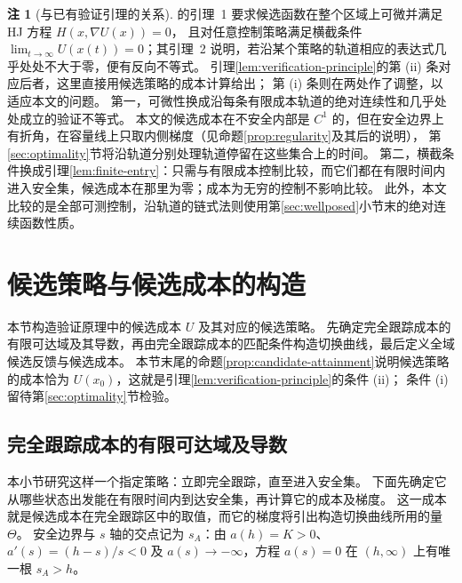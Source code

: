 \documentclass[11pt,a4paper,UTF8]{ctexart}
\theoremstyle{definition}
\newtheorem{remark}[theorem]{注}
\begin{document}
\begin{remark}[与已有验证引理的关系]
\label{rem:verification-principle-msw}
\citet[附录A.1]{MicloSpiroWeibull2022} 的引理~1 要求候选函数在整个区域上可微并满足 HJ 方程 $H(x,\nabla U(x))=0$，
且对任意控制策略满足横截条件 $\lim_{t\to\infty}U(x(t))=0$；其引理~2 说明，若沿某个策略的轨道相应的表达式几乎处处不大于零，便有反向不等式。
引理\ref{lem:verification-principle}的第 (ii) 条对应后者，这里直接用候选策略的成本计算给出；
第 (i) 条则在两处作了调整，以适应本文的问题。
第一，可微性换成沿每条有限成本轨道的绝对连续性和几乎处处成立的验证不等式。
本文的候选成本在不安全内部是 $C^1$ 的，但在安全边界上有折角，在容量线上只取内侧梯度（见命题\ref{prop:regularity}及其后的说明），
第\ref{sec:optimality}节将沿轨道分别处理轨道停留在这些集合上的时间。
第二，横截条件换成引理\ref{lem:finite-entry}：只需与有限成本控制比较，而它们都在有限时间内进入安全集，候选成本在那里为零；成本为无穷的控制不影响比较。
此外，本文比较的是全部可测控制，沿轨道的链式法则使用第\ref{sec:wellposed}小节末的绝对连续函数性质。
\end{remark}

\section{候选策略与候选成本的构造}
\label{sec:candidate-construction}

本节构造验证原理中的候选成本 $U$ 及其对应的候选策略。
先确定完全跟踪成本的有限可达域及其导数，再由完全跟踪成本的匹配条件构造切换曲线，最后定义全域候选反馈与候选成本。
本节末尾的命题\ref{prop:candidate-attainment}说明候选策略的成本恰为 $U(x_0)$，这就是引理\ref{lem:verification-principle}的条件 (ii)；
条件 (i) 留待第\ref{sec:optimality}节检验。

\subsection{完全跟踪成本的有限可达域及导数}
\label{sec:q1-value}
本小节研究这样一个指定策略：立即完全跟踪，直至进入安全集。
下面先确定它从哪些状态出发能在有限时间内到达安全集，再计算它的成本及梯度。
这一成本就是候选成本在完全跟踪区中的取值，而它的梯度将引出构造切换曲线所用的量 $\Theta$。
安全边界与 $s$ 轴的交点记为 $s_A$：由 $a(h)=K>0$、$a'(s)=(h-s)/s<0$ 及 $a(s)\to-\infty$，方程 $a(s)=0$ 在 $(h,\infty)$ 上有唯一根 $s_A>h$。
\end{document}
